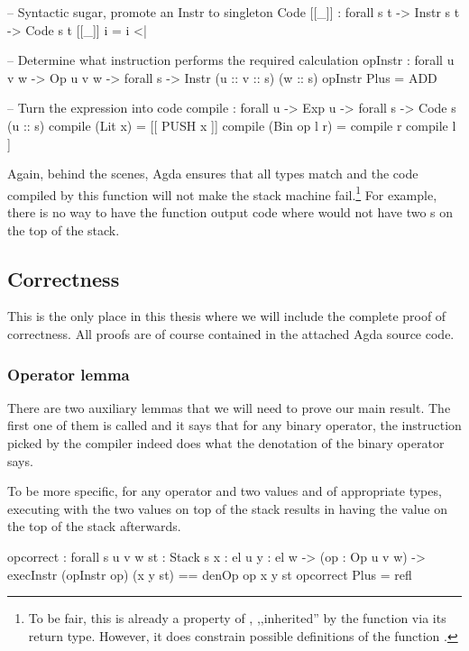 \begin{code}
  -- Syntactic sugar, promote an Instr to singleton Code
  [[_\;]] : forall {s t} -> Instr s t -> Code s t
  [[_\;]] i = i <| \nil

  -- Determine what instruction performs the required calculation
  opInstr : forall {u v w} -> Op u v w -> forall {s} -> Instr (u :: v :: s) (w :: s)
  opInstr Plus = ADD

  -- Turn the expression into code
  compile : forall {u} -> Exp u -> forall {s} -> Code s (u :: s)
  compile (Lit x) = [[ PUSH x ]]
  compile (Bin op l r) = compile r \app compile l \app [[ opInstr op ]]
\end{code}

\noindent Again, behind the scenes, Agda ensures that all types match and the
code compiled by this function will not make the stack machine fail.\footnote{
  To be fair, this is already a property of , ,,inherited'' by the
  function  via its return type.  However, it does constrain
possible definitions of the function .} For example, there is no
way to have the function  output code where  would
not have two s on the top of the stack.

\subsection{Correctness}

This is the only place in this thesis where we will include the complete proof
of correctness. All proofs are of course contained in the attached Agda source
code.

\subsubsection{Operator lemma}

There are two auxiliary lemmas that we will need to prove our main result. The
first one of them is called  and it says that for any binary
operator, the instruction picked by the compiler indeed does what the
denotation of the binary operator says.

To be more specific, for any operator  and two values  and
 of appropriate types, executing  with the two
values on top of the stack results in having the value 
on the top of the stack afterwards.

\begin{code}
  op\-correct : forall {s u v w} {st : Stack s} {x : el u} {y : el w}
    -> (op : Op u v w)
    -> execInstr (opInstr op) (x \scons y \scons st) == denOp op x y \scons st
  op\-correct Plus = refl
\end{code}

